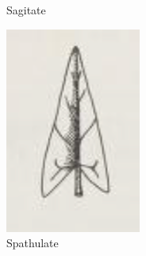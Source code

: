 \documentclass[12pt,english]{article}
\begin{document}
\begin{figure}[!hbt]
\begin{centre}
\begin{minipage}{0.19\textwidth}
	\end{minipage}
	\begin{minipage}{0.19\textwidth}
		\caption{Sagitate}
		\includegraphics[width=\textwidth]{../code/contour/original/sagitate}
	\end{minipage}
	\begin{minipage}{0.19\textwidth}
		\caption{Spathulate}

\end{minipage}
\end{centre}
\end{figure}
\end{document}

